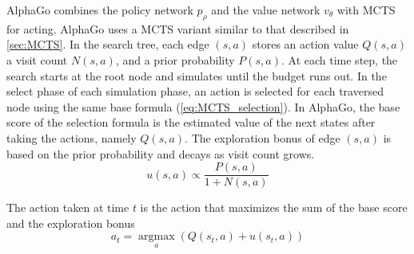 \documentclass[12pt]{article}
\newcommand{\note}[1]{\todo[color=yellow!40,bordercolor=none,linecolor=black]{#1}}
\begin{document}
AlphaGo combines the policy network $p_{\rho}$ and the value network $v_{\theta}$ with MCTS for acting.
AlphaGo uses a MCTS variant similar to that described in \ref{sec:MCTS}.
In the search tree, each edge $(s, a)$ stores an action value $Q(s, a)$ a visit count $N(s, a)$, and a prior probability $P(s, a)$.
At each time step, the search starts at the root node and simulates until the budget runs out.
In the select phase of each simulation phase, an action is selected for each traversed node using the same base formula (\ref{eq:MCTS_selection}).
In AlphaGo, the base score of the selection formula is the estimated value of the next states after taking the actions, namely $Q(s, a)$.
The exploration bonus of edge $(s, a)$ is based on the prior probability and decays as visit count grows.
\begin{equation}
    u(s, a) \propto \frac{P(s, a)}{1 + N(s, a)}
\end{equation}

The action taken at time $t$ is the action that maximizes the sum of the base score and the exploration bonus
\begin{equation}
    a_{t}=\underset{a}{\operatorname{argmax}}\left(Q\left(s_{t}, a\right)+u\left(s_{t}, a\right)\right)
\end{equation}




\end{document}
